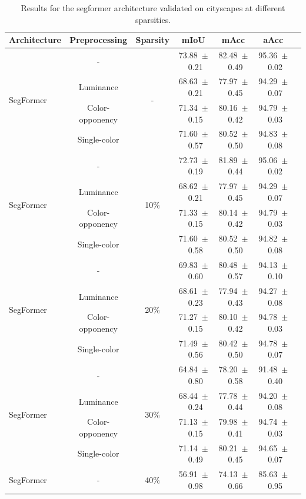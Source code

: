 \begin{table}[h]
\centering
\caption{Results for the segformer architecture validated on cityscapes at different sparsities.}
\begin{tabular}{@{}lccc ccc@{}}
\toprule
Architecture & Preprocessing & Sparsity & mIoU & mAcc & aAcc \\
\midrule

\multirow{4}{*}{SegFormer} & - & \multirow{4}{*}{-} & 73.88~$\pm$~0.21 & 82.48~$\pm$~0.49 & 95.36~$\pm$~0.02 \\
& Luminance & & 68.63~$\pm$~0.21 & 77.97~$\pm$~0.45 & 94.29~$\pm$~0.07 \\
& Color-opponency & & 71.34~$\pm$~0.15 & 80.16~$\pm$~0.42 & 94.79~$\pm$~0.03 \\
& Single-color & & 71.60~$\pm$~0.57 & 80.52~$\pm$~0.50 & 94.83~$\pm$~0.08 \\
\midrule
\multirow{4}{*}{SegFormer} & - & \multirow{4}{*}{10\%} & 72.73~$\pm$~0.19 & 81.89~$\pm$~0.44 & 95.06~$\pm$~0.02 \\
& Luminance & & 68.62~$\pm$~0.21 & 77.97~$\pm$~0.45 & 94.29~$\pm$~0.07 \\
& Color-opponency & & 71.33~$\pm$~0.15 & 80.14~$\pm$~0.42 & 94.79~$\pm$~0.03 \\
& Single-color & & 71.60~$\pm$~0.58 & 80.52~$\pm$~0.50 & 94.82~$\pm$~0.08 \\
\midrule
\multirow{4}{*}{SegFormer} & - & \multirow{4}{*}{20\%} & 69.83~$\pm$~0.60 & 80.48~$\pm$~0.57 & 94.13~$\pm$~0.10 \\
& Luminance & & 68.61~$\pm$~0.23 & 77.94~$\pm$~0.43 & 94.27~$\pm$~0.08 \\
& Color-opponency & & 71.27~$\pm$~0.15 & 80.10~$\pm$~0.42 & 94.78~$\pm$~0.03 \\
& Single-color & & 71.49~$\pm$~0.56 & 80.42~$\pm$~0.50 & 94.78~$\pm$~0.07 \\
\midrule
\multirow{4}{*}{SegFormer} & - & \multirow{4}{*}{30\%} & 64.84~$\pm$~0.80 & 78.20~$\pm$~0.58 & 91.48~$\pm$~0.40 \\
& Luminance & & 68.44~$\pm$~0.24 & 77.78~$\pm$~0.44 & 94.20~$\pm$~0.08 \\
& Color-opponency & & 71.13~$\pm$~0.15 & 79.98~$\pm$~0.41 & 94.74~$\pm$~0.03 \\
& Single-color & & 71.14~$\pm$~0.49 & 80.21~$\pm$~0.45 & 94.65~$\pm$~0.07 \\
\midrule
\multirow{4}{*}{SegFormer} & - & \multirow{4}{*}{40\%} & 56.91~$\pm$~0.98 & 74.13~$\pm$~0.66 & 85.63~$\pm$~0.95 \\

\end{tabular}
\end{table}
